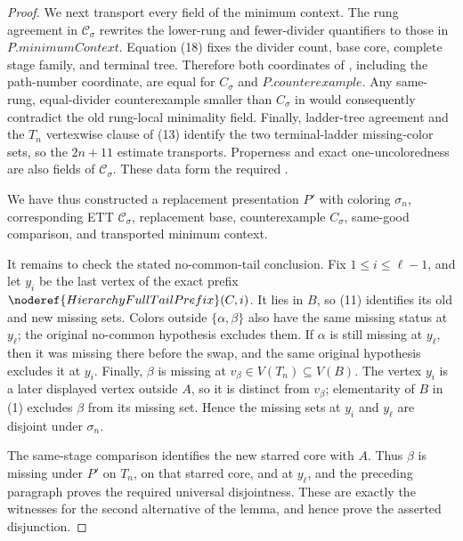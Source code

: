 \begin{proof}
We next transport every field of the minimum context.  The rung agreement
in \(\mathcal C_\sigma\) rewrites the lower-rung and fewer-divider
quantifiers to those in \(P.\mathit{minimumContext}\).
Equation (18) fixes the divider count, base core, complete stage family,
and terminal tree.  Therefore both coordinates of
, including the path-number
coordinate, are equal for \(C_\sigma\) and
\(P.\mathit{counterexample}\).  Any same-rung, equal-divider
counterexample smaller than \(C_\sigma\) in
 would consequently contradict the
old rung-local minimality field.  Finally, ladder-tree agreement and the
\(T_n\) vertexwise clause of (13) identify the two terminal-ladder
missing-color sets, so the \(2n+11\) estimate transports.  Properness and
exact one-uncoloredness are also fields of
\(\mathcal C_\sigma\).  These data form the required
.

We have thus constructed a replacement presentation \(P'\) with coloring
\(\sigma_n\), corresponding ETT \(\mathcal C_\sigma\), replacement base,
counterexample \(C_\sigma\), same-good comparison, and transported
minimum context.

It remains to check the stated no-common-tail conclusion.  Fix
\(1\leq i\leq\ell-1\), and let \(y_i\) be the last vertex of the exact
prefix \(\noderef{HierarchyFullTailPrefix}(C,i)\).  It lies in \(B\), so
(11) identifies its old and new missing sets.  Colors outside
\(\{\alpha,\beta\}\) also have the same missing status at \(y_\ell\);
the original no-common hypothesis excludes them.  If \(\alpha\) is still
missing at \(y_\ell\), then it was missing there before the swap, and the
same original hypothesis excludes it at \(y_i\).  Finally, \(\beta\) is
missing at \(v_\beta\in V(T_n)\subseteq V(B)\).  The vertex \(y_i\) is a
later displayed vertex outside \(A\), so it is distinct from \(v_\beta\);
elementarity of \(B\) in (1) excludes \(\beta\) from its missing set.
Hence the missing sets at \(y_i\) and \(y_\ell\) are disjoint under
\(\sigma_n\).

The same-stage comparison identifies the new starred core with \(A\).
Thus \(\beta\) is missing under \(P'\) on \(T_n\), on that starred core,
and at \(y_\ell\), and the preceding paragraph proves the required
universal disjointness.  These are exactly the witnesses for the second
alternative of the lemma, and hence prove the asserted disjunction.
\end{proof}
